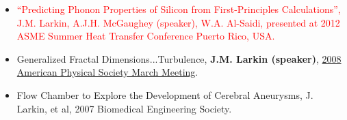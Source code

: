 \documentclass{article}
\newcommand{\lineunder}{\vspace*{-8pt} \\ \hspace*{-18pt} \hrulefill \\}
\newcommand{\header}[1]{{\hspace*{-15pt}\vspace*{6pt} \textsc{#1}} \vspace*{-6pt} \lineunder}
\newenvironment{achievements}{\begin{list}{$\bullet$}{\topsep 0pt \itemsep -2pt}}{\vspace*{4pt}\end{list}}
\begin{document}
\begin{itemize}[leftmargin=*]
\item \textcolor{red}{“Predicting Phonon Properties of Silicon from First-Principles Calculations”, J.M. Larkin, A.J.H. McGaughey (speaker), W.A. Al-Saidi, presented at 2012 ASME Summer Heat Transfer Conference Puerto Rico, USA.} 
\item Generalized Fractal Dimensions...Turbulence, \textbf{J.M. Larkin (speaker)}, \href{http://meetings.aps.org/Meeting/MAR08/Content/1017}{2008 American Physical Society March Meeting}.
\item Flow Chamber to Explore the Development of Cerebral Aneurysms, J. Larkin, et al, 2007 Biomedical Engineering Society. 
\end{itemize}



\end{document}
